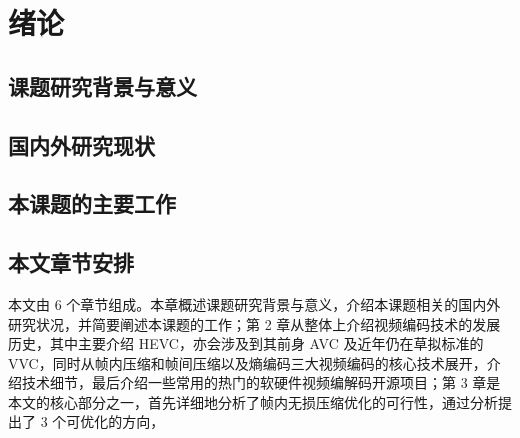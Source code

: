 \chapter{绪论}
\label{cha:c1}

\section{课题研究背景与意义}

\section{国内外研究现状}

\section{本课题的主要工作}

\section{本文章节安排}
本文由 6 个章节组成。本章概述课题研究背景与意义，介绍本课题相关的国内外研究状况，并简要阐述本课题的工作；第 2 章从整体上介绍视频编码技术的发展历史，其中主要介绍 HEVC，亦会涉及到其前身 AVC 及近年仍在草拟标准的 VVC，同时从帧内压缩和帧间压缩以及熵编码三大视频编码的核心技术展开，介绍技术细节，最后介绍一些常用的热门的软硬件视频编解码开源项目；第 3 章是本文的核心部分之一，首先详细地分析了帧内无损压缩优化的可行性，通过分析提出了 3 个可优化的方向，